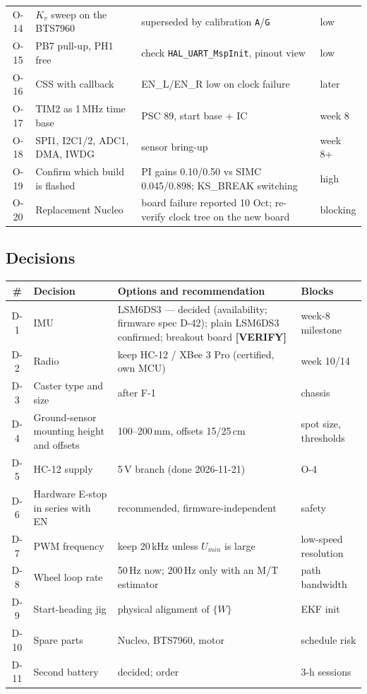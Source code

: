 \documentclass[11pt,a4paper]{article}
\newcommand{\mk}[2]{\textsf{\scriptsize\bfseries\colorbox{#1bg}{\color{#1}[#2]}}}
\newcommand{\VERIFY}{\mk{cold}{VERIFY}}
\newcommand{\tw}[1]{{\small\textcolor{warn}{\textsf{#1}}}}
\newcommand{\tb}[1]{{\small\textcolor{bad}{\textsf{#1}}}}
\newcommand{\code}[1]{\texttt{\small #1}}
\begin{document}
\begin{center}
\begin{tabularx}{\textwidth}{@{}cP{40mm}Ll@{}}
O-14 & $K_v$ sweep on the BTS7960 & superseded by calibration \code{A}/\code{G} & low\\
O-15 & PB7 pull-up, PH1 free & check \code{HAL\_UART\_MspInit}, pinout view & low\\
O-16 & CSS with callback & EN\_L/EN\_R low on clock failure & later\\
O-17 & TIM2 as 1\,MHz time base & PSC 89, start base + IC & week 8\\
O-18 & SPI1, I2C1/2, ADC1, DMA, IWDG & sensor bring-up & week 8+\\
O-19 & Confirm which build is flashed & PI gains 0.10/0.50 vs SIMC 0.045/0.898; KS\_BREAK switching & \tw{high}\\
O-20 & Replacement Nucleo & board failure reported 10 Oct; re-verify clock tree on the new board & \tb{blocking}\\
\bottomrule
\end{tabularx}
\end{center}

\subsection{Decisions}\label{sec:open-decisions}

\begin{center}
\small
\begin{tabularx}{\textwidth}{@{}cP{40mm}Ll@{}}
\toprule
\# & \textbf{Decision} & \textbf{Options and recommendation} & \textbf{Blocks}\\
\midrule
D-1 & IMU & LSM6DS3 --- decided (availability; firmware spec D-42); plain LSM6DS3 confirmed; breakout board \VERIFY & week-8 milestone\\
D-2 & Radio & keep HC-12 / XBee 3 Pro (certified, own MCU) & week 10/14\\
D-3 & Caster type and size & after F-1 & chassis\\
D-4 & Ground-sensor mounting height and offsets & 100--200\,mm, offsets 15/25\,cm & spot size, thresholds\\
D-5 & HC-12 supply & 5\,V branch (done 2026-11-21) & O-4\\
D-6 & Hardware E-stop in series with EN & recommended, firmware-independent & safety\\
D-7 & PWM frequency & keep 20\,kHz unless $U_{min}$ is large & low-speed resolution\\
D-8 & Wheel loop rate & 50\,Hz now; 200\,Hz only with an M/T estimator & path bandwidth\\
D-9 & Start-heading jig & physical alignment of $\{W\}$ & EKF init\\
D-10 & Spare parts & Nucleo, BTS7960, motor & schedule risk\\
D-11 & Second battery & decided; order & 3-h sessions\\
\bottomrule
\end{tabularx}
\end{center}
\end{document}
